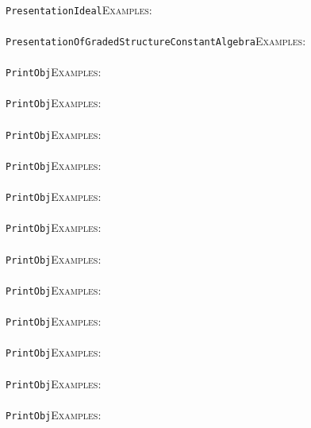 \documentclass[a4paper,11pt]{report}
\begin{document}
{{ \\
 \texttt{PresentationIdeal}{\nobreakspace}{\nobreakspace}{\nobreakspace}{\nobreakspace}\textsc{Examples:} \\
 \\
 \texttt{PresentationOfGradedStructureConstantAlgebra}{\nobreakspace}{\nobreakspace}{\nobreakspace}{\nobreakspace}\textsc{Examples:} \\
 \\
 \texttt{PrintObj}{\nobreakspace}{\nobreakspace}{\nobreakspace}{\nobreakspace}\textsc{Examples:} \\
 \\
 \texttt{PrintObj}{\nobreakspace}{\nobreakspace}{\nobreakspace}{\nobreakspace}\textsc{Examples:} \\
 \\
 \texttt{PrintObj}{\nobreakspace}{\nobreakspace}{\nobreakspace}{\nobreakspace}\textsc{Examples:} \\
 \\
 \texttt{PrintObj}{\nobreakspace}{\nobreakspace}{\nobreakspace}{\nobreakspace}\textsc{Examples:} \\
 \\
 \texttt{PrintObj}{\nobreakspace}{\nobreakspace}{\nobreakspace}{\nobreakspace}\textsc{Examples:} \\
 \\
 \texttt{PrintObj}{\nobreakspace}{\nobreakspace}{\nobreakspace}{\nobreakspace}\textsc{Examples:} \\
 \\
 \texttt{PrintObj}{\nobreakspace}{\nobreakspace}{\nobreakspace}{\nobreakspace}\textsc{Examples:} \\
 \\
 \texttt{PrintObj}{\nobreakspace}{\nobreakspace}{\nobreakspace}{\nobreakspace}\textsc{Examples:} \\
 \\
 \texttt{PrintObj}{\nobreakspace}{\nobreakspace}{\nobreakspace}{\nobreakspace}\textsc{Examples:} \\
 \\
 \texttt{PrintObj}{\nobreakspace}{\nobreakspace}{\nobreakspace}{\nobreakspace}\textsc{Examples:} \\
 \\
 \texttt{PrintObj}{\nobreakspace}{\nobreakspace}{\nobreakspace}{\nobreakspace}\textsc{Examples:} \\
 \\
 \texttt{PrintObj}{\nobreakspace}{\nobreakspace}{\nobreakspace}{\nobreakspace}\textsc{Examples:} \\
}}
\end{document}
